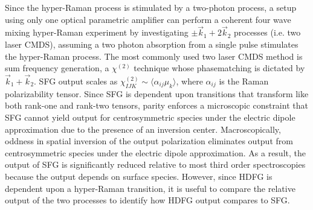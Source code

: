 \documentclass[aip, jcp, reprint, twocolumn]{revtex4-2}
\begin{document}
Since the hyper-Raman process is stimulated by a two-photon process, a setup using only one optical parametric amplifier can perform a coherent four wave mixing hyper-Raman experiment by investigating $\pm \vec{k}_1 + 2\vec{k}_2$ processes (i.e. two laser CMDS), assuming a two photon absorption from a single pulse stimulates the hyper-Raman process.
The most commonly used two laser CMDS method is sum frequency generation, a $\chi^{(2)}$ technique whose phasematching is dictated by $\vec{k}_1 + \vec{k}_2$.
SFG output scales as $\chi^{(2)}_{IJK} \sim \langle \alpha_{ij} \mu_k \rangle$, where $\alpha_{ij}$ is the Raman polarizability tensor.
Since SFG is dependent upon transitions that transform like both rank-one and rank-two tensors, parity enforces a microscopic constraint that SFG cannot yield output for centrosymmetric species under the electric dipole approximation due to the presence of an inversion center. \cite{RN230}
Macroscopically, oddness in spatial inversion of the output polarization eliminates output from centrosymmetric species under the electric dipole approximation.\cite{RN227, RN132}
As a result, the output of SFG is significantly reduced relative to most third order spectroscopies because the output depends on surface species.
However, since HDFG is dependent upon a hyper-Raman transition, it is useful to compare the relative output of the two processes to identify how HDFG output compares to SFG.
\end{document}
